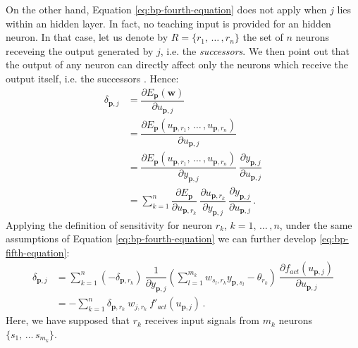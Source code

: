 \documentclass[11pt, a4paper]{report}
\numberwithin{equation}{chapter}
\theoremstyle{theorem}
\theoremstyle{definition}
\numberwithin{figure}{section}
\begin{document}
		On the other hand, Equation \eqref{eq:bp-fourth-equation} does not apply when $j$ lies within an hidden layer. In fact, no teaching input is provided for an hidden neuron. In that case, let us denote by $R = \lbrace r_1, \, \ldots \, , r_n \rbrace$ the set of $n$ neurons receveing the output generated by $j$, i.e. the \emph{successors}. We then point out that the output of any neuron can directly affect only the neurons which receive the output itself, i.e. the successors \cite{Kri}. Hence: 
		\begin{equation}
			\label{eq:bp-fifth-equation}
			\begin{aligned}
				\delta_{\boldsymbol{p},j} & = \dfrac{\partial E_{\boldsymbol{p}}(\boldsymbol{w})}{\partial u_{\boldsymbol{p},j}} \\
				& = \dfrac{\partial E_{\boldsymbol{p}}(u_{\boldsymbol{p},r_1}, \, \ldots \, , u_{\boldsymbol{p},r_n})}{\partial u_{\boldsymbol{p},j}} \\
				& = \dfrac{\partial E_{\boldsymbol{p}}(u_{\boldsymbol{p},r_1}, \, \ldots \, , u_{\boldsymbol{p},r_n})}{\partial y_{\boldsymbol{p},j}} ~ \dfrac{\partial y_{\boldsymbol{p},j}}{\partial u_{\boldsymbol{p},j}} \\
				& = \sum_{k = 1}^{n} \dfrac{\partial E_{\boldsymbol{p}}}{\partial u_{\boldsymbol{p},r_k}} ~ \dfrac{\partial u_{\boldsymbol{p},r_k}}{\partial y_{\boldsymbol{p},j}} ~ \dfrac{\partial y_{\boldsymbol{p},j}}{\partial u_{\boldsymbol{p},j}} \, .
			\end{aligned}
		\end{equation}
		Applying the definition of sensitivity for neuron $r_k$, $k = 1, \, \ldots \, , n$, under the same assumptions of Equation \eqref{eq:bp-fourth-equation} we can further develop \eqref{eq:bp-fifth-equation}:
		\begin{equation}
			\label{eq:bp-sixth-equation}
			\begin{aligned}
			\delta_{\boldsymbol{p},j} & = \sum_{k = 1}^n \left( - \delta_{\boldsymbol{p},r_k} \right) ~ \dfrac{1}{\partial y_{\boldsymbol{p},j}} \left( \sum_{l = 1}^{m_k} w_{s_l,r_k} y_{\boldsymbol{p},s_l} - \theta_{r_k} \right) ~ \dfrac{\partial f_{act}(u_{\boldsymbol{p},j})}{\partial u_{\boldsymbol{p},j}} \\
			& = - \sum_{k = 1}^n \delta_{\boldsymbol{p},r_k} ~ w_{j,r_k} ~ f'_{act}(u_{\boldsymbol{p},j}) \, .
			\end{aligned}
		\end{equation}
		Here, we have supposed that $r_k$ receives input signals from $m_k$ neurons $\lbrace s_1, \, \ldots \, s_{m_k} \rbrace$.
		
\end{document}

